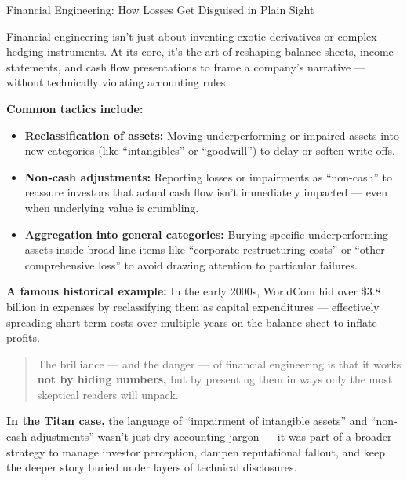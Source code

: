 \begin{HistoricalSidebar}{Financial Engineering: How Losses Get Disguised in Plain Sight}

    Financial engineering isn’t just about inventing exotic derivatives or complex hedging instruments.  
    At its core, it’s the art of reshaping balance sheets, income statements, and cash flow presentations to frame a company’s narrative — without technically violating accounting rules.
    
    \medskip
    
    \textbf{Common tactics include:}
    
    \begin{itemize}
        \item \textbf{Reclassification of assets:} Moving underperforming or impaired assets into new categories (like “intangibles” or “goodwill”) to delay or soften write-offs.
        
        \item \textbf{Non-cash adjustments:} Reporting losses or impairments as “non-cash” to reassure investors that actual cash flow isn’t immediately impacted — even when underlying value is crumbling.
        
        \item \textbf{Aggregation into general categories:} Burying specific underperforming assets inside broad line items like “corporate restructuring costs” or “other comprehensive loss” to avoid drawing attention to particular failures.
    \end{itemize}
    
    \medskip
    
    \textbf{A famous historical example:}  
    In the early 2000s, WorldCom hid over \$3.8 billion in expenses by reclassifying them as capital expenditures — effectively spreading short-term costs over multiple years on the balance sheet to inflate profits.
    
    \medskip
    
    \begin{quote}
        The brilliance — and the danger — of financial engineering is that it works  
        \textbf{not by hiding numbers,}  
        but by presenting them in ways only the most skeptical readers will unpack.
    \end{quote}
    
    \textbf{In the Titan case,} the language of “impairment of intangible assets” and “non-cash adjustments” wasn’t just dry accounting jargon —  
    it was part of a broader strategy to manage investor perception, dampen reputational fallout, and keep the deeper story buried under layers of technical disclosures.
    
\end{HistoricalSidebar}


